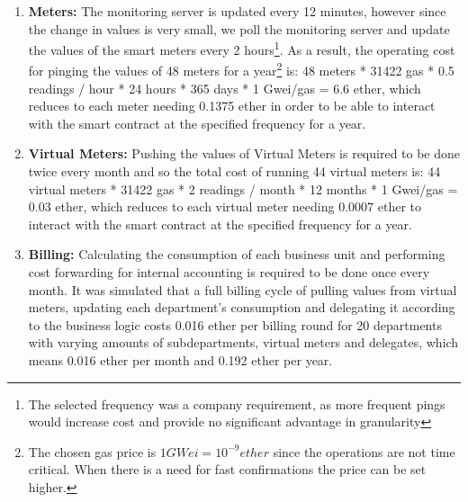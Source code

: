 \begin{enumerate}
    \item \textbf{Meters:} The monitoring server is updated every 12 minutes, however since the change in values is very small, we poll the monitoring server and update the values of the smart meters every 2 hours\footnote{The selected frequency was a company requirement, as more frequent pings would increase cost and provide no significant advantage in granularity}. As a result, the operating cost for pinging the values of 48 meters for a year\footnote{The chosen gas price is $1 GWei = 10^{-9} ether$ since the operations are not time critical. When there is a need for fast confirmations the price can be set higher.} is: 48 meters * 31422 gas * 0.5 readings / hour * 24 hours * 365 days * 1 Gwei/gas  = 6.6 ether, which reduces to each meter needing 0.1375 ether in order to be able to interact with the smart contract at the specified frequency for a year. 
    \item \textbf{Virtual Meters:} Pushing the values of Virtual Meters is required to be done twice every month and so the total cost of running 44 virtual meters is: 44 virtual meters * 31422 gas * 2 readings / month * 12 months * 1 Gwei/gas  = 0.03 ether, which reduces to each virtual meter needing 0.0007 ether to interact with the smart contract at the specified frequency for a year. 
    \item \textbf{Billing:} Calculating the consumption of each business unit and performing cost forwarding for internal accounting is required to be done once every month. It was simulated that a full billing cycle of pulling values from virtual meters, updating each department's consumption and delegating it according to the business logic costs 0.016 ether per billing round for 20 departments with varying amounts of subdepartments, virtual meters and delegates, which means 0.016 ether per month and 0.192 ether per year.


\end{enumerate}
